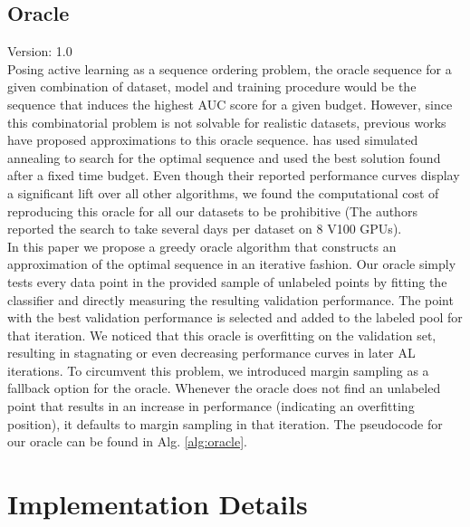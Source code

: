 \documentclass[]{article}
\begin{document}
\subsection{Oracle}\label{sec:oracle}
{\color{red} Version: 1.0}\\
Posing active learning as a sequence ordering problem, the oracle sequence for a given combination of dataset, model and training procedure would be the sequence that induces the highest AUC score for a given budget.
However, since this combinatorial problem is not solvable for realistic datasets, previous works have proposed approximations to this oracle sequence.
\cite{zhou2021towards} has used simulated annealing to search for the optimal sequence and used the best  solution found after a fixed time budget. 
Even though their reported performance curves display a significant lift over all other algorithms, we found the computational cost of reproducing this oracle for all our datasets to be prohibitive (The authors reported the search to take several days per dataset on 8 V100 GPUs). \\
In this paper we propose a greedy oracle algorithm that constructs an approximation of the optimal sequence in an iterative fashion.
Our oracle simply tests every data point in the provided sample of unlabeled points by fitting the classifier and directly measuring the resulting validation performance.
The point with the best validation performance is selected and added to the labeled pool for that iteration.
We noticed that this oracle is overfitting on the validation set, resulting in stagnating or even decreasing performance curves in later AL iterations.
To circumvent this problem, we introduced margin sampling as a fallback option for the oracle.
Whenever the oracle does not find an unlabeled point that results in an increase in performance (indicating an overfitting position), it defaults to margin sampling in that iteration.
The pseudocode for our oracle can be found in Alg. \ref{alg:oracle}.


\section{Implementation Details}

\end{document}
